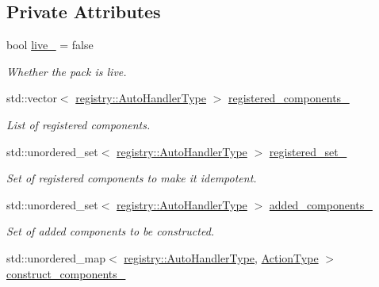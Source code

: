 \subsection*{Private Attributes}
\begin{DoxyCompactItemize}
\item 
bool \hyperlink{structvt_1_1runtime_1_1component_1_1_component_pack_a77177fd8678d5bf04bada652ffee1e2f}{live\+\_\+} = false
\begin{DoxyCompactList}\small\item\em Whether the pack is live. \end{DoxyCompactList}\item 
std\+::vector$<$ \hyperlink{namespacevt_1_1runtime_1_1component_1_1registry_a9b86518797c7bb91babf0ca8ee7d06e6}{registry\+::\+Auto\+Handler\+Type} $>$ \hyperlink{structvt_1_1runtime_1_1component_1_1_component_pack_a615b981d265458c952406691c89ce0f6}{registered\+\_\+components\+\_\+}
\begin{DoxyCompactList}\small\item\em List of registered components. \end{DoxyCompactList}\item 
std\+::unordered\+\_\+set$<$ \hyperlink{namespacevt_1_1runtime_1_1component_1_1registry_a9b86518797c7bb91babf0ca8ee7d06e6}{registry\+::\+Auto\+Handler\+Type} $>$ \hyperlink{structvt_1_1runtime_1_1component_1_1_component_pack_a7dd24ee6d0e1a8e66dd35257ba3e6d75}{registered\+\_\+set\+\_\+}
\begin{DoxyCompactList}\small\item\em Set of registered components to make it idempotent. \end{DoxyCompactList}\item 
std\+::unordered\+\_\+set$<$ \hyperlink{namespacevt_1_1runtime_1_1component_1_1registry_a9b86518797c7bb91babf0ca8ee7d06e6}{registry\+::\+Auto\+Handler\+Type} $>$ \hyperlink{structvt_1_1runtime_1_1component_1_1_component_pack_aebf0761f1902a5336a247190ad8ba47d}{added\+\_\+components\+\_\+}
\begin{DoxyCompactList}\small\item\em Set of added components to be constructed. \end{DoxyCompactList}\item 
std\+::unordered\+\_\+map$<$ \hyperlink{namespacevt_1_1runtime_1_1component_1_1registry_a9b86518797c7bb91babf0ca8ee7d06e6}{registry\+::\+Auto\+Handler\+Type}, \hyperlink{namespacevt_ae0a5a7b18cc99d7b732cb4d44f46b0f3}{Action\+Type} $>$ \hyperlink{structvt_1_1runtime_1_1component_1_1_component_pack_a0c54536ec06304f279f09205f83c8cd7}{construct\+\_\+components\+\_\+}

\end{DoxyCompactItemize}
